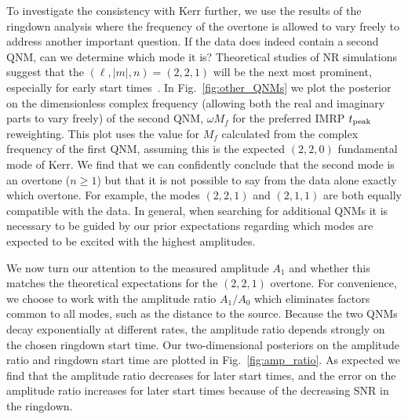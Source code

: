 To investigate the consistency with Kerr further, we use the results of the ringdown analysis where the frequency of the overtone is allowed to vary freely to address another important question. 
If the data does indeed contain a second QNM, can we determine which mode it is?
Theoretical studies of NR simulations suggest that the $(\ell,|m|,n)=(2,2,1)$ will be the next most prominent, especially for early start times~\cite{Giesler:2019uxc}. 
In Fig.~\ref{fig:other_QNMs} we plot the posterior on the dimensionless complex frequency (allowing both the real and imaginary parts to vary freely) of the second QNM, $\omega M_f$ for the preferred IMRP $t_{\rm peak}$ reweighting.
This plot uses the value for $M_f$ calculated from the complex frequency of the first QNM, assuming this is the expected $(2,2,0)$ fundamental mode of Kerr.
We find that we can confidently conclude that the second mode is an overtone ($n\geq 1$) but that it is not possible to say from the data alone exactly which overtone. 
For example, the modes $(2,2,1)$ and $(2,1,1)$ are both equally compatible with the data. 
In general, when searching for additional QNMs it is necessary to be guided by our prior expectations regarding which modes are expected to be excited with the highest amplitudes.

We now turn our attention to the measured amplitude $A_1$ and whether this matches the theoretical expectations for the $(2,2,1)$ overtone. 
For convenience, we choose to work with the amplitude ratio $A_1/A_0$ which eliminates factors common to all modes, such as the distance to the source. 
Because the two QNMs decay exponentially at different rates, the amplitude ratio depends strongly on the chosen ringdown start time.
Our two-dimensional posteriors on the amplitude ratio and ringdown start time are plotted in Fig.~\ref{fig:amp_ratio}.
As expected we find that the amplitude ratio decreases for later start times, and the error on the amplitude ratio increases for later start times because of the decreasing SNR in the ringdown.

